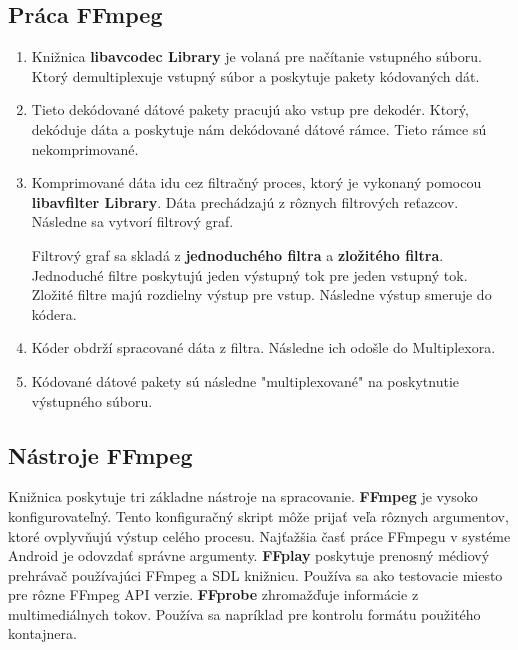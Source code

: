 \documentclass[12pt, oneside]{book}
\begin{document}
\subsection{Práca FFmpeg}

\begin{enumerate}


\item Knižnica \textbf{libavcodec Library} je volaná pre načítanie vstupného súboru. Ktorý demultiplexuje vstupný súbor a poskytuje pakety kódovaných dát.

\item Tieto dekódované dátové pakety pracujú ako vstup pre dekodér. Ktorý, dekóduje dáta a poskytuje nám dekódované dátové rámce. Tieto rámce sú nekomprimované.


\item Komprimované dáta idu cez filtračný proces, ktorý je vykonaný pomocou \textbf{libavfilter Library}. Dáta prechádzajú z rôznych filtrových reťazcov. Následne sa vytvorí filtrový graf.

Filtrový graf sa skladá z \textbf{jednoduchého filtra} a \textbf{zložitého filtra}. Jednoduché filtre poskytujú jeden výstupný tok pre jeden vstupný tok. Zložité filtre majú rozdielny výstup pre vstup. Následne výstup smeruje do kódera.

\item Kóder obdrží spracované dáta z filtra. Následne ich odošle do Multiplexora.

\item Kódované dátové pakety sú následne "multiplexované" na poskytnutie výstupného súboru.

 \cite{ffmpeg02}

\end{enumerate}

\subsection{Nástroje FFmpeg}

\hspace{15pt} Knižnica poskytuje tri základne nástroje na spracovanie.
\textbf{FFmpeg} je vysoko konfigurovateľný. Tento konfiguračný skript môže prijať veľa rôznych argumentov, ktoré ovplyvňujú výstup celého procesu. Najťažšia časť práce FFmpegu v systéme Android je odovzdať správne argumenty.
\textbf{FFplay} poskytuje prenosný médiový prehrávač používajúci FFmpeg a SDL knižnicu. Používa sa ako testovacie miesto pre rôzne FFmpeg API verzie.
\textbf{FFprobe} zhromažďuje informácie z multimediálnych tokov. Používa sa napríklad pre kontrolu formátu použitého kontajnera.
\end{document}

